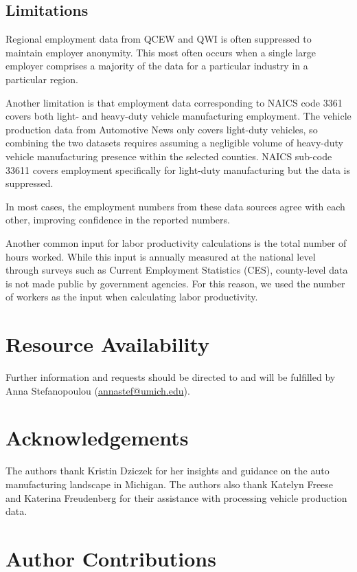 \documentclass[sn-mathphys,Numbered]{sn-jnl}%
\begin{document}
\subsection{Limitations}

Regional employment data from QCEW and QWI is often suppressed to maintain employer anonymity. This most often occurs when a single large employer comprises a majority of the data for a particular industry in a particular region.

Another limitation is that employment data corresponding to NAICS code 3361 covers both light- and heavy-duty vehicle manufacturing employment. The vehicle production data from Automotive News only covers light-duty vehicles, so combining the two datasets requires assuming a negligible volume of heavy-duty vehicle manufacturing presence within the selected counties. NAICS sub-code 33611 covers employment specifically for light-duty manufacturing but the data is suppressed.

In most cases, the employment numbers from these data sources agree with each other, improving confidence in the reported numbers. 

Another common input for labor productivity calculations is the total number of hours worked. While this input is annually measured at the national level through surveys such as Current Employment Statistics (CES), county-level data is not made public by government agencies. For this reason, we used the number of workers as the input when calculating labor productivity.

\section*{Resource Availability}

Further information and requests should be directed to and will be fulfilled by Anna Stefanopoulou (\url{annastef@umich.edu}).

\section*{Acknowledgements}

The authors thank Kristin Dziczek for her insights and guidance on the auto manufacturing landscape in Michigan. The authors also thank Katelyn Freese and Katerina Freudenberg for their assistance with processing vehicle production data.

\section*{Author Contributions}
\end{document}
